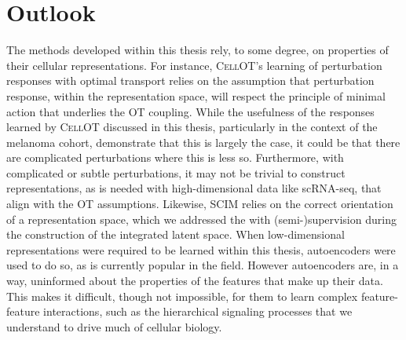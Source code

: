 \section{Outlook}
The methods developed within this thesis rely, to some degree, on properties of their cellular representations.
For instance, \textsc{CellOT}'s learning of perturbation responses with optimal transport relies on the assumption that perturbation response, within the representation space, will respect the principle of minimal action that underlies the OT coupling.
While the usefulness of the responses learned by \textsc{CellOT} discussed in this thesis, particularly in the context of the melanoma cohort, demonstrate that this is largely the case, it could be that there are complicated perturbations where this is less so.
Furthermore, with complicated or subtle perturbations, it may not be trivial to construct representations, as is needed with high-dimensional data like scRNA-seq, that align with the OT assumptions.
Likewise, \textsc{SCIM}
relies on the correct orientation of a representation space, which we addressed the with (semi-)supervision during the construction of the integrated latent space.
When low-dimensional representations were required to be learned within this thesis,
autoencoders were used to do so, as is currently popular in the field.
However autoencoders are, in a way, uninformed about the properties of the features that make up their data.
This makes it difficult, though not impossible, for them to learn complex feature-feature interactions, such as the hierarchical signaling processes that we understand to drive much of cellular biology.

